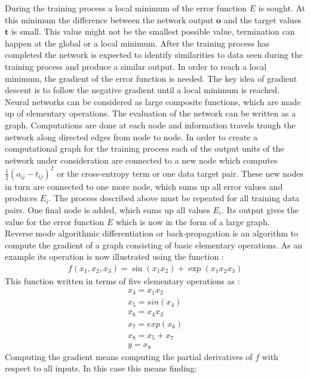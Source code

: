 During the training process a local minimum of the error function $E$ is sought. At this minimum the difference between the network output $\mathbf{o}$ and the target values $\mathbf{t}$ is small. This value might not be the smallest possible value, termination can happen at the global or a local minimum.
After the training process has completed the network is expected to identify similarities to data seen during the training process and produce a similar output.
In order to reach a local minimum, the gradient of the error function is needed. The key idea of gradient descent is to follow the negative gradient until a local minimum is reached.
Neural networks can be considered as large composite functions, which are made up of elementary operations. The evaluation of the network can be written as a graph. Computations are done at each node and information travels trough the network along directed edges from node to node. In order to create a computational graph for the training process each of the output units of the network under consideration are connected to a new node which computes $\frac{1}{2}(o_{ij} - t_{ij})^2$\cite[page 157]{Rojas1996} or the cross-entropy term or one data target pair. These new nodes in turn are connected to one more node, which sums up all error values and produces $E_i$. The process described above must be repeated for all training data pairs. One final node is added, which sums up all values $E_i$. Its output gives the value for the error function $E$ which is now in the form of a large graph.\\
Reverse mode algorithmic differentiation or back-propagation is an algorithm to compute the gradient of a graph consisting of basic elementary operations. As an example its operation is now illustrated using the function \cite[page 69]{Diehl2013}:
\begin{align}
f(x_1,x_2,x_3) = \sin(x_1 x_2) + \exp(x_1 x_2 x_3)
\label{eq:backFun}
\end{align}
This function written in terms of five elementary operations as \cite[page 70]{Diehl2013}:
\begin{align}
x_4 = x_1 x_2 \\
x_5 = sin(x_4)\\
x_6 = x_4 x_3 \\
x_7 = exp(x_6) \\
x_8 = x_5 + x_7 \\
y = x_8
\end{align}
Computing the gradient means computing the partial derivatives of $f$ with respect to all inputs. In this case this means finding:
